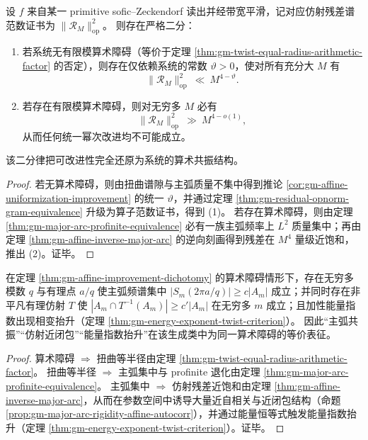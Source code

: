 \begin{theorem}\label{thm:gm-affine-improvement-dichotomy}
设 \(f\) 来自某一 primitive sofic--Zeckendorf 读出并经带宽平滑，记对应仿射残差谱范数证书为 \(\|\mathcal{R}_M\|_{\mathrm{op}}^2\)。
则存在严格二分：
\begin{enumerate}
  \item 若系统无有限模算术障碍（等价于定理 \ref{thm:gm-twist-equal-radius-arithmetic-factor} 的否定），则存在仅依赖系统的常数 \(\vartheta>0\)，使对所有充分大 \(M\) 有
  \[
  \|\mathcal{R}_M\|_{\mathrm{op}}^2\ \ll\ M^{4-\vartheta}.
  \]
  \item 若存在有限模算术障碍，则对无穷多 \(M\) 必有
  \[
  \|\mathcal{R}_M\|_{\mathrm{op}}^2\ \gg\ M^{4-o(1)},
  \]
  从而任何统一幂次改进均不可能成立。
\end{enumerate}
该二分律把可改进性完全还原为系统的算术共振结构。
\end{theorem}

\begin{proof}
若无算术障碍，则由扭曲谱隙与主弧质量不集中得到推论 \ref{cor:gm-affine-uniformization-improvement} 的统一 \(\vartheta\)，并通过定理 \ref{thm:gm-residual-opnorm-gram-equivalence} 升级为算子范数证书，得到 (1)。
若存在算术障碍，则由定理 \ref{thm:gm-major-arc-profinite-equivalence} 必有一族主弧频率上 \(L^2\) 质量集中；再由定理 \ref{thm:gm-affine-inverse-major-arc} 的逆向刻画得到残差在 \(M^4\) 量级近饱和，推出 (2)。证毕。
\end{proof}

\begin{proposition}\label{prop:gm-triple-complementarity}
在定理 \ref{thm:gm-affine-improvement-dichotomy} 的算术障碍情形下，存在无穷多模数 \(q\) 与有理点 \(a/q\) 使主弧频谱集中
\(
|S_m(2\pi a/q)|\ge c|A_m|
\)
成立；并同时存在非平凡有理仿射 \(T\) 使
\(
|A_m\cap T^{-1}(A_m)|\ge c'|A_m|
\)
在无穷多 \(m\) 成立；且加性能量指数出现相变抬升（定理 \ref{thm:gm-energy-exponent-twist-criterion}）。
因此“主弧共振”“仿射近闭包”“能量指数抬升”在该生成类中为同一算术障碍的等价表征。
\end{proposition}

\begin{proof}
算术障碍 \(\Rightarrow\) 扭曲等半径由定理 \ref{thm:gm-twist-equal-radius-arithmetic-factor}。
扭曲等半径 \(\Rightarrow\) 主弧集中与 profinite 退化由定理 \ref{thm:gm-major-arc-profinite-equivalence}。
主弧集中 \(\Rightarrow\) 仿射残差近饱和由定理 \ref{thm:gm-affine-inverse-major-arc}，从而在参数空间中诱导大量近自相关与近闭包结构（命题 \ref{prop:gm-major-arc-rigidity-affine-autocorr}），并通过能量恒等式触发能量指数抬升（定理 \ref{thm:gm-energy-exponent-twist-criterion}）。证毕。
\end{proof}

